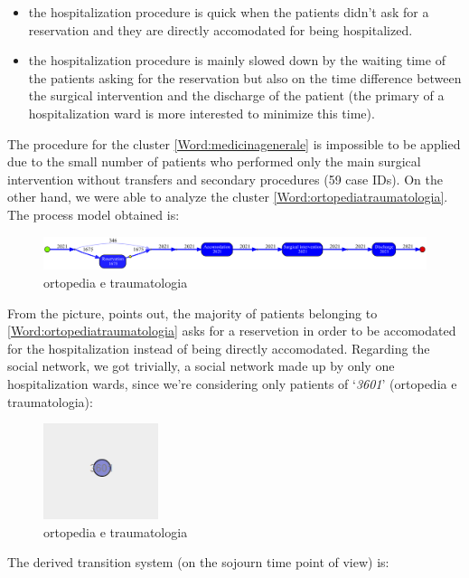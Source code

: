 \begin{itemize}
\item the hospitalization procedure is quick when the patients didn't ask for a reservation and they are directly accomodated for being hospitalized.
\item the hospitalization procedure is mainly slowed down by the waiting time of the patients asking for the reservation but also on the time difference between the surgical intervention and the discharge of the patient (the primary of a hospitalization ward is more interested to minimize this time).
\end{itemize}
The procedure for the cluster \ref{Word:medicinagenerale} is impossible to be applied due to the small number of patients who performed only the main surgical intervention without transfers and secondary procedures (59 case IDs). On the other hand, we were able to analyze the cluster \ref{Word:ortopediatraumatologia}. The process model obtained is:
\begin{figure} [htbp]
\includegraphics[width=\textwidth]{RicoveriInductiveVisualMiner3601}
\caption{ortopedia e traumatologia}
\end{figure}
\newline
From the picture, points out, the majority of patients belonging to \ref{Word:ortopediatraumatologia} asks for a reservetion in order to be accomodated for the hospitalization instead of being directly accomodated. Regarding the social network, we got trivially, a social network made up by only one hospitalization wards, since we're considering only patients of `\textit{3601}' (ortopedia e traumatologia): 
\begin{figure} [htbp]
\includegraphics[width=0.3\textwidth]{RicoveriSocialNetwork3601}
\caption{ortopedia e traumatologia}
\end{figure}
\clearpage
\noindent
The derived transition system (on the sojourn time point of view) is:

